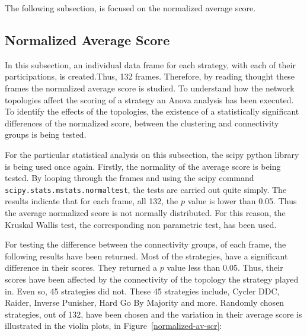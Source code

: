The following subsection, is focused on the normalized average score.

\subsection{Normalized Average Score}
\label{sub:chap-four-normalized-score}
In this subsection, an individual data frame for each strategy, with each of
their participations, is created.Thus, 132 frames. Therefore, by reading thought
these frames
the normalized average score is studied. To understand how the network topologies
affect the scoring of a strategy an Anova analysis has been executed.
To identify the effects of the topologies, the existence of a
statistically significant differences of the normalized score, between the
clustering and connectivity groups is being tested.

For the particular statistical analysis on this subsection, the scipy
python library is being used once again. Firstly, the normality of the average
score is being tested. By looping through the frames and using the scipy
command \texttt{scipy.stats.mstats.normaltest}, the tests are carried out quite simply.
The results indicate that for
each frame, all 132, the \(p\) value is lower than 0.05. Thus the average normalized
score is not normally distributed. For this reason, the Kruskal Wallis test, the
corresponding non parametric test, has been used.

For testing the difference between the connectivity groups, of each frame,
the following results have been returned. Most of the strategies, have a significant
difference in their scores. They returned a \(p\) value less than 0.05.
Thus, their scores have been affected by the connectivity  of the topology the
strategy played in. Even so, 45 strategies did not. These 45 strategies include,
Cycler DDC, Raider, Inverse Punisher, Hard Go By Majority and more. Randomly
chosen strategies, out of 132, have been chosen and the variation in their average
score is illustrated in the violin plots, in Figure~\ref{normalized-av-scr}:

